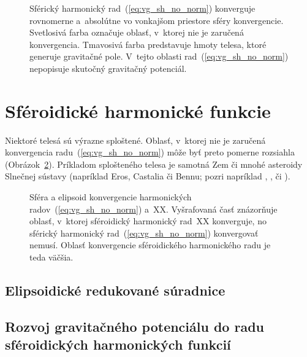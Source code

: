 \documentclass[a4paper,12pt]{book}
\begin{document}
\begin{figure}
\centering

\caption{Sférický harmonický rad~(\ref{eq:vg_sh_no_norm}) konverguje rovnomerne 
a~absolútne vo vonkajšom priestore sféry konvergencie.  Svetlosivá farba 
označuje oblasť, v~ktorej nie je zaručená konvergencia.  Tmavosivá farba 
predstavuje hmoty telesa, ktoré generuje gravitačné pole.  V~tejto oblasti 
rad~(\ref{eq:vg_sh_no_norm}) nepopisuje skutočný gravitačný potenciál.}
\label{fig:spherical_harmonics_convergence}
\end{figure}







\section{Sféroidické harmonické funkcie}

Niektoré telesá sú výrazne sploštené.  Oblasť, v~ktorej nie je zaručená 
konvergencia radu~(\ref{eq:vg_sh_no_norm}) môže byť preto pomerne rozsiahla 
(Obrázok~\ref{fig:spheroidal_harmonics_convergence}).  Príkladom splošteného 
telesa je samotná Zem či mnohé asteroidy Slnečnej sústavy (napríklad Eros, 
Castalia či Bennu; pozri napríklad \cite{Garmier2001}, \cite{Hu2015}, 
\cite{Sebera2016} či \cite{Reimond2016}).

\begin{figure}
\centering

\caption{Sféra a elipsoid konvergencie harmonických 
radov~(\ref{eq:vg_sh_no_norm}) a~XX.  Vyšrafovaná časť znázorňuje oblasť, 
v~ktorej sféroidický harmonický rad~XX konverguje, no sférický harmonický 
rad~(\ref{eq:vg_sh_no_norm}) konvergovať nemusí.  Oblasť konvergencie 
sféroidického harmonického radu je teda väčšia.}
\label{fig:spheroidal_harmonics_convergence}
\end{figure}


\subsection{Elipsoidické redukované súradnice}



\subsection{Rozvoj gravitačného potenciálu do radu sféroidických harmonických 
funkcií}
\end{document}
